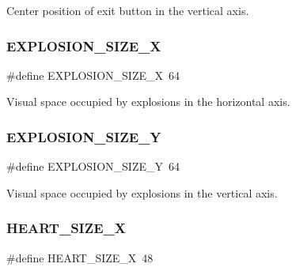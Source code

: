 Center position of exit button in the vertical axis. 

\hypertarget{group___b_m_ps_holder_ga05fea38384e3b8729c157fb3370d6c91}{}\label{group___b_m_ps_holder_ga05fea38384e3b8729c157fb3370d6c91} 
\subsubsection{\texorpdfstring{E\+X\+P\+L\+O\+S\+I\+O\+N\+\_\+\+S\+I\+Z\+E\+\_\+X}{EXPLOSION\_SIZE\_X}}
{\footnotesize\ttfamily \#define E\+X\+P\+L\+O\+S\+I\+O\+N\+\_\+\+S\+I\+Z\+E\+\_\+X~64}



Visual space occupied by explosions in the horizontal axis. 

\hypertarget{group___b_m_ps_holder_ga0eb35331668d32bc55b98c41006da26d}{}\label{group___b_m_ps_holder_ga0eb35331668d32bc55b98c41006da26d} 
\subsubsection{\texorpdfstring{E\+X\+P\+L\+O\+S\+I\+O\+N\+\_\+\+S\+I\+Z\+E\+\_\+Y}{EXPLOSION\_SIZE\_Y}}
{\footnotesize\ttfamily \#define E\+X\+P\+L\+O\+S\+I\+O\+N\+\_\+\+S\+I\+Z\+E\+\_\+Y~64}



Visual space occupied by explosions in the vertical axis. 

\hypertarget{group___b_m_ps_holder_gae4bece6dba12dec287829c15c2f112a1}{}\label{group___b_m_ps_holder_gae4bece6dba12dec287829c15c2f112a1} 
\subsubsection{\texorpdfstring{H\+E\+A\+R\+T\+\_\+\+S\+I\+Z\+E\+\_\+X}{HEART\_SIZE\_X}}
{\footnotesize\ttfamily \#define H\+E\+A\+R\+T\+\_\+\+S\+I\+Z\+E\+\_\+X~48}




